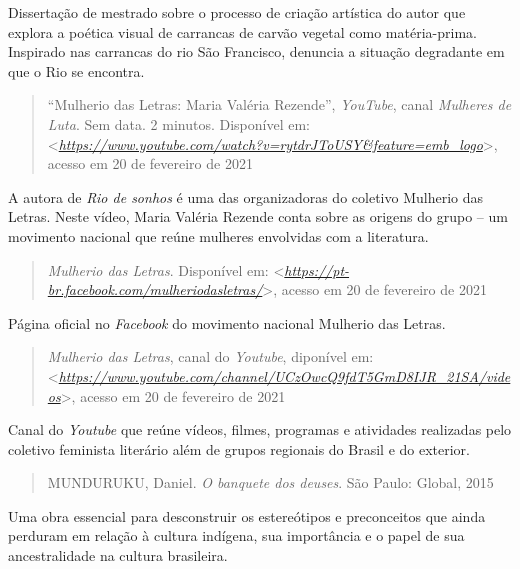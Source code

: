 \documentclass{extarticle}
\begin{document}
    Dissertação de mestrado sobre o processo de criação artística do
    autor que explora a poética visual de carrancas de carvão vegetal
    como matéria-prima. Inspirado nas carrancas do rio São Francisco,
    denuncia a situação degradante em que o Rio se encontra.

    \begin{quote}
    ``Mulherio das Letras: Maria Valéria Rezende'', \emph{YouTube},
    canal \emph{Mulheres de Luta}. Sem data. 2 minutos. Disponível em:
    \textless{}\href{https://www.youtube.com/watch?v=rytdrJToUSY\&feature=emb_logo}{\emph{https://www.youtube.com/watch?v=rytdrJToUSY\&feature=emb\_logo}}\textgreater{},
    acesso em 20 de fevereiro de 2021
    \end{quote}

    A autora de \emph{Rio de sonhos} é uma das organizadoras do coletivo
    Mulherio das Letras. Neste vídeo, Maria Valéria Rezende conta sobre
    as origens do grupo -- um movimento nacional que reúne mulheres
    envolvidas com a literatura.

    \begin{quote}
    \emph{Mulherio das Letras}. Disponível em:
    \textless{}\href{https://pt-br.facebook.com/mulheriodasletras/}{\emph{https://pt-br.facebook.com/mulheriodasletras/}}\textgreater{},
    acesso em 20 de fevereiro de 2021
    \end{quote}

    Página oficial no \emph{Facebook} do movimento nacional Mulherio das
    Letras.

    \begin{quote}
    \emph{Mulherio das Letras}, canal do \emph{Youtube}, diponível em:
    \textless{}\href{https://www.youtube.com/channel/UCzOwcQ9fdT5GmD8IJR_21SA/videos}{\emph{https://www.youtube.com/channel/UCzOwcQ9fdT5GmD8IJR\_21SA/videos}}\textgreater{},
    acesso em 20 de fevereiro de 2021
    \end{quote}

    Canal do \emph{Youtube} que reúne vídeos, filmes, programas e
    atividades realizadas pelo coletivo feminista literário além de
    grupos regionais do Brasil e do exterior.

    \begin{quote}
    MUNDURUKU, Daniel. \emph{O banquete dos deuses}. São Paulo: Global,
    2015
    \end{quote}

    Uma obra essencial para desconstruir os estereótipos e preconceitos
    que ainda perduram em relação à cultura indígena, sua importância e
    o papel de sua ancestralidade na cultura brasileira.
\end{document}
